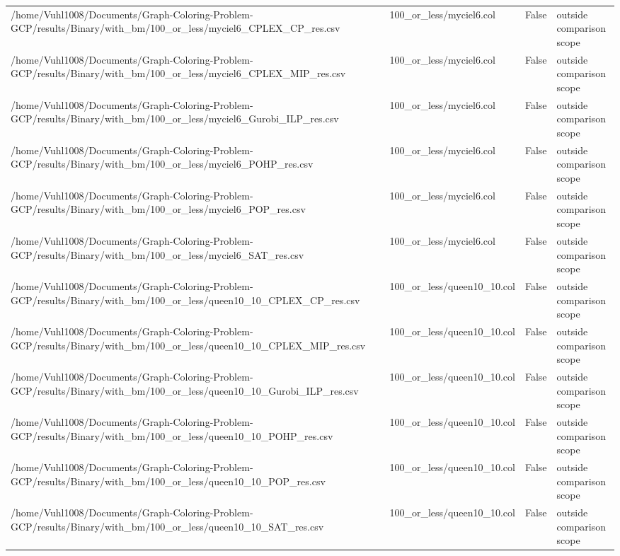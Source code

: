 \begin{table}[htbp]
\begin{tabular}{llll}
/home/Vuhl1008/Documents/Graph-Coloring-Problem-GCP/results/Binary/with\_bm/100\_or\_less/myciel6\_CPLEX\_CP\_res.csv & 100\_or\_less/myciel6.col & False & outside comparison scope \\
/home/Vuhl1008/Documents/Graph-Coloring-Problem-GCP/results/Binary/with\_bm/100\_or\_less/myciel6\_CPLEX\_MIP\_res.csv & 100\_or\_less/myciel6.col & False & outside comparison scope \\
/home/Vuhl1008/Documents/Graph-Coloring-Problem-GCP/results/Binary/with\_bm/100\_or\_less/myciel6\_Gurobi\_ILP\_res.csv & 100\_or\_less/myciel6.col & False & outside comparison scope \\
/home/Vuhl1008/Documents/Graph-Coloring-Problem-GCP/results/Binary/with\_bm/100\_or\_less/myciel6\_POHP\_res.csv & 100\_or\_less/myciel6.col & False & outside comparison scope \\
/home/Vuhl1008/Documents/Graph-Coloring-Problem-GCP/results/Binary/with\_bm/100\_or\_less/myciel6\_POP\_res.csv & 100\_or\_less/myciel6.col & False & outside comparison scope \\
/home/Vuhl1008/Documents/Graph-Coloring-Problem-GCP/results/Binary/with\_bm/100\_or\_less/myciel6\_SAT\_res.csv & 100\_or\_less/myciel6.col & False & outside comparison scope \\
/home/Vuhl1008/Documents/Graph-Coloring-Problem-GCP/results/Binary/with\_bm/100\_or\_less/queen10\_10\_CPLEX\_CP\_res.csv & 100\_or\_less/queen10\_10.col & False & outside comparison scope \\
/home/Vuhl1008/Documents/Graph-Coloring-Problem-GCP/results/Binary/with\_bm/100\_or\_less/queen10\_10\_CPLEX\_MIP\_res.csv & 100\_or\_less/queen10\_10.col & False & outside comparison scope \\
/home/Vuhl1008/Documents/Graph-Coloring-Problem-GCP/results/Binary/with\_bm/100\_or\_less/queen10\_10\_Gurobi\_ILP\_res.csv & 100\_or\_less/queen10\_10.col & False & outside comparison scope \\
/home/Vuhl1008/Documents/Graph-Coloring-Problem-GCP/results/Binary/with\_bm/100\_or\_less/queen10\_10\_POHP\_res.csv & 100\_or\_less/queen10\_10.col & False & outside comparison scope \\
/home/Vuhl1008/Documents/Graph-Coloring-Problem-GCP/results/Binary/with\_bm/100\_or\_less/queen10\_10\_POP\_res.csv & 100\_or\_less/queen10\_10.col & False & outside comparison scope \\
/home/Vuhl1008/Documents/Graph-Coloring-Problem-GCP/results/Binary/with\_bm/100\_or\_less/queen10\_10\_SAT\_res.csv & 100\_or\_less/queen10\_10.col & False & outside comparison scope \\

\end{tabular}
\end{table}
